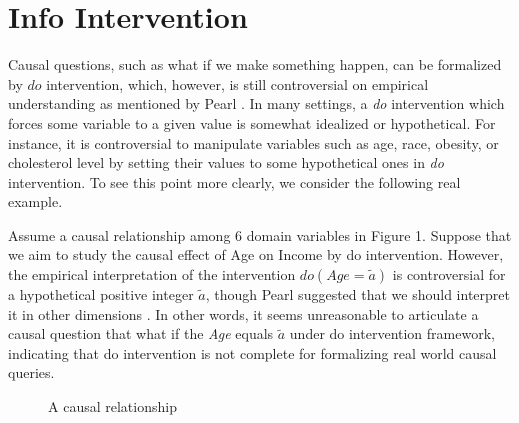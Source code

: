 \section{Info Intervention} 
\label{sec:info}


 



Causal questions, such as what if we make something happen, can be formalized by $do$ intervention, which, however, is still controversial on empirical understanding as 
mentioned by Pearl \cite{Pearl2019do, pearl2018does}.
In many settings, a \emph{do} intervention which forces some variable to a given value is somewhat idealized or hypothetical. 
For instance, it is controversial to manipulate variables such as age, race, obesity, or cholesterol level by setting their values to some hypothetical ones in \emph{do} intervention. To see this point more clearly, we consider the following real example. 
\begin{Eg} %
    \label{eg:real}
	Assume a causal relationship among 6 domain variables in Figure 1.
	Suppose that we aim to study the causal effect of Age on Income  by do intervention. 
	However, the empirical interpretation of the intervention $do(Age = \tilde{a})$ 
	is controversial for a hypothetical positive integer $\tilde{a}$,  though Pearl suggested that we should interpret it in other dimensions \cite{Pearl2019do}. In other words, it seems unreasonable to articulate a causal question that what if the \emph{Age} equals $\tilde{a}$ under do intervention framework, indicating that do intervention is not complete for formalizing real world causal queries. 
    \begin{figure}[ht]
        \label{fig:real}
    	\centering
    	\caption{A causal relationship}
    	\label{fig:exercise}
    \end{figure}
\end{Eg}

